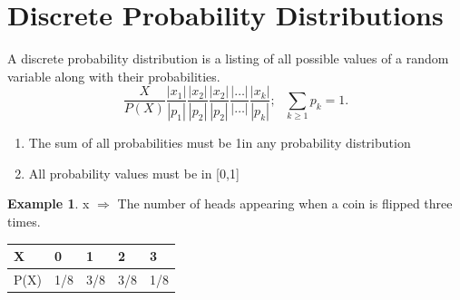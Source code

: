 \documentclass[12pt]{article}
\theoremstyle{definition}
\newtheorem{exmp}{Example}[section]
\begin{document}
\section{Discrete Probability Distributions}
A discrete probability distribution is a listing of 
all possible values of a random variable along 
with their probabilities. \\
\begin{equation}
    \displaystyle \frac{X}{P(X)} \frac{|x_1|}{|p_1|} \frac{|x_2|}{|p_2|} \frac{|x_2|}{|p_2|} 
    \frac{|\dots|}{|\dots|} \frac{|x_k|}{|p_k|}; \  \ \  \sum _{k \geq 1} p_k = 1.
\end{equation}    
\begin{enumerate}
    \item The sum of all probabilities must be 1in any probability distribution
    \item All probability values must be in [0,1]
\end{enumerate}
\begin{exmp}
    x $\Rightarrow$ The number of heads appearing when a coin is flipped three times.

\end{exmp}

\begin{longtable}[c]{lllll}
    X    & 0   & 1   & 2   & 3   \\
    \endfirsthead
    \endhead
    P(X) & 1/8 & 3/8 & 3/8 & 1/8
\end{longtable}
\end{document}
